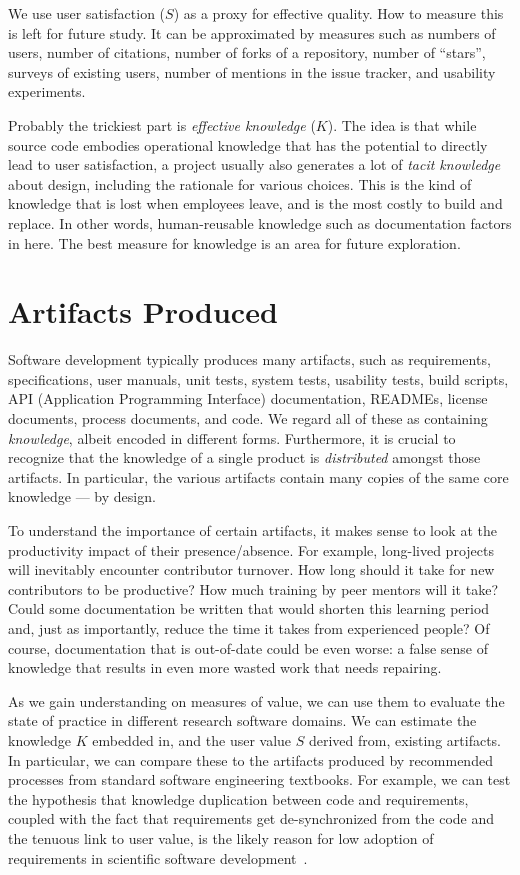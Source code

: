 \documentclass[sigconf, authorversion, nonacm]{acmart}
\begin{document}
We use user satisfaction ($S$) as a proxy for effective quality. How to 
measure this is left for future study. It can be approximated by measures
such as numbers of users, number of citations, number
of forks of a repository, number of ``stars'', surveys of existing users,
number of mentions in the issue tracker, and usability experiments.

Probably the trickiest part is \emph{effective knowledge} ($K$). The idea
is that while source code embodies operational knowledge that has the
potential to directly lead to user satisfaction, a project usually also
generates a lot of \emph{tacit knowledge} about design, including the
rationale for various choices. This is the kind of knowledge that is lost
when employees leave, and is the most costly to build and replace.
In other words, human-reusable knowledge such as documentation factors in
here.  The best measure for knowledge is an area for future exploration.

\section{Artifacts Produced}

Software development typically produces many artifacts, such as
requirements, specifications, user manuals, unit
tests, system tests, usability tests, build scripts, API (Application
Programming Interface) documentation, READMEs, license documents, process
documents, and code. We regard all of these as containing
\emph{knowledge}, albeit encoded in different forms. Furthermore, it is
crucial to recognize that the knowledge of a single product is 
\emph{distributed} amongst those artifacts. In particular, the various
artifacts contain many copies of the same core knowledge --- by design.

To understand the importance of certain artifacts, it makes sense to look
at the productivity impact of their presence/absence. For example,
long-lived projects will inevitably encounter contributor turnover. How long
should it take for new contributors to be productive? How much training by
peer mentors will it take? Could some documentation be written that would
shorten this learning period and, just as importantly, reduce the time it
takes from experienced people? Of course, documentation that is out-of-date
could be even worse: a false sense of knowledge that results in even more
wasted work that needs repairing.

As we gain understanding on measures of value, we can use them to evaluate the
state of practice in different research software domains. We can estimate the
knowledge $K$ embedded in, and the user value $S$ derived from, existing
artifacts. In particular, we can compare these to the artifacts produced by
recommended processes from standard software engineering textbooks. For example,
we can test the hypothesis that knowledge duplication between code and requirements, coupled with the fact
that requirements get de-synchronized from the code and the tenuous link to
user value, is the likely reason for low adoption of requirements in
scientific software development~\cite{HeatonAndCarver2015}.
 
\end{document}
